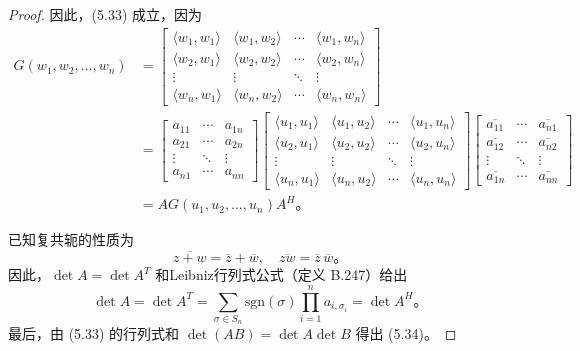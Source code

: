 \documentclass[a4paper]{ctexart}
\begin{document}
{\begin{proof}
因此，(5.33) 成立，因为
\begin{align*}
G(w_1, w_2, \ldots, w_n) &= \begin{bmatrix}
\langle w_1, w_1 \rangle & \langle w_1, w_2 \rangle & \cdots & \langle w_1, w_n \rangle \\
\langle w_2, w_1 \rangle & \langle w_2, w_2 \rangle & \cdots & \langle w_2, w_n \rangle \\
\vdots & \vdots & \ddots & \vdots \\
\langle w_n, w_1 \rangle & \langle w_n, w_2 \rangle & \cdots & \langle w_n, w_n \rangle
\end{bmatrix} \\
&= \begin{bmatrix}
a_{11} & \cdots & a_{1n} \\
a_{21} & \cdots & a_{2n} \\
\vdots & \ddots & \vdots \\
a_{n1} & \cdots & a_{nn}
\end{bmatrix} 
\begin{bmatrix}
\langle u_1, u_1 \rangle & \langle u_1, u_2 \rangle & \cdots & \langle u_1, u_n \rangle \\
\langle u_2, u_1 \rangle & \langle u_2, u_2 \rangle & \cdots & \langle u_2, u_n \rangle \\
\vdots & \vdots & \ddots & \vdots \\
\langle u_n, u_1 \rangle & \langle u_n, u_2 \rangle & \cdots & \langle u_n, u_n \rangle
\end{bmatrix} 
\begin{bmatrix}
\overline{a_{11}} & \cdots & \overline{a_{n1}} \\
\overline{a_{12}} & \cdots & \overline{a_{n2}} \\
\vdots & \ddots & \vdots \\
\overline{a_{1n}} & \cdots & \overline{a_{nn}}
\end{bmatrix} \\
&= A G(u_1, u_2, \ldots, u_n) A^H。
\end{align*}

已知复共轭的性质为
\[
\overline{z + w} = \overline{z} + \overline{w}, \quad \overline{z w} = \overline{z} \, \overline{w}。
\]
因此，$\det A = \det A^T$ 和Leibniz行列式公式（定义 B.247）给出
\[
\det A = \det A^T = \sum_{\sigma \in S_n} \text{sgn}(\sigma) \prod_{i=1}^n a_{i, \sigma_i} = \det A^H。
\]
最后，由 (5.33) 的行列式和 $\det(AB) = \det A \det B$ 得出 (5.34)。
\end{proof}

}
\end{document}

